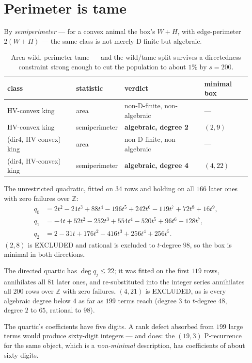 \documentclass[11pt]{article}
\newcommand{\Z}{\mathbb{Z}}
\begin{document}
\section{Perimeter is tame}
\label{sec:perimeter}

By \emph{semiperimeter}
--- for a convex animal the box's $W + H$, with edge-perimeter $2(W{+}H)$ ---
the same class is not merely D-finite but algebraic.

\begin{table}[H]
\centering\small
\begin{tabular}{l l l l}
\toprule
class & statistic & verdict & minimal box \\
\midrule
HV-convex king & area & non-D-finite, non-algebraic & --- \\
HV-convex king & semiperimeter & \textbf{algebraic, degree 2} & $(2,9)$ \\
(dir4, HV-convex) king & area & non-D-finite, non-algebraic & --- \\
(dir4, HV-convex) king & semiperimeter & \textbf{algebraic, degree 4} & $(4,22)$ \\
\bottomrule
\end{tabular}
\caption{Area wild, perimeter tame --- and the wild/tame split survives a
directedness constraint strong enough to cut the population to about $1\%$ by
$s = 200$.}
\label{tab:perim}
\end{table}

The unrestricted quadratic, fitted on $34$ rows and holding on all $166$ later
ones with zero failures over $\Z$:
\[
\begin{aligned}
q_0 &= 2t^2 - 21t^3 + 88t^4 - 196t^5 + 242t^6 - 119t^7 + 72t^8 + 16t^9, \\
q_1 &= -4t + 52t^2 - 252t^3 + 554t^4 - 520t^5 + 96t^6 + 128t^7, \\
q_2 &= 2 - 31t + 176t^2 - 416t^3 + 256t^4 + 256t^5 .
\end{aligned}
\]
$(2,8)$ is EXCLUDED and rational is excluded to $t$-degree $98$, so the box is
minimal in both directions.

The directed quartic has $\deg q_j \le 22$; it was fitted on the first $119$
rows, annihilates all $81$ later ones, and re-substituted into the integer
series annihilates all $200$ rows over $\Z$ with zero failures. $(4,21)$ is
EXCLUDED, as is every algebraic degree below $4$ as far as $199$ terms reach
(degree $3$ to $t$-degree $48$, degree $2$ to $65$, rational to $98$).

\begin{remark}
The quartic's coefficients have five digits. A rank defect absorbed from $199$
large terms would produce sixty-digit integers --- and does: the $(19,3)$
P-recurrence for the same object, which is a \emph{non-minimal} description, has
coefficients of about sixty digits.
\end{remark}
\end{document}
